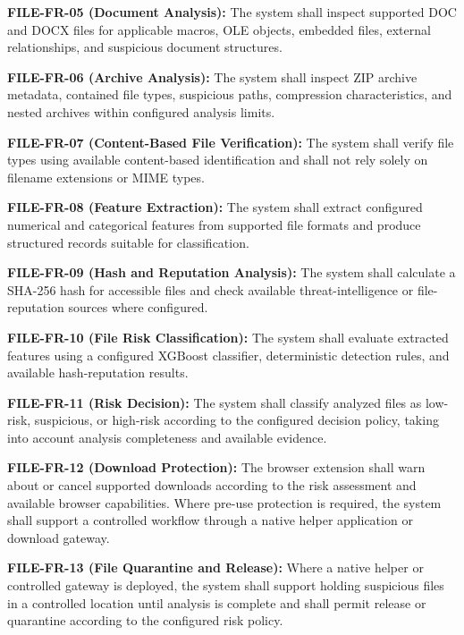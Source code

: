 \documentclass[12pt,a4paper]{report}
\begin{document}
\textbf{FILE-FR-05 (Document Analysis):} The system shall inspect supported DOC and DOCX files for applicable macros, OLE objects, embedded files, external relationships, and suspicious document structures.\par

\textbf{FILE-FR-06 (Archive Analysis):} The system shall inspect ZIP archive metadata, contained file types, suspicious paths, compression characteristics, and nested archives within configured analysis limits.\par

\textbf{FILE-FR-07 (Content-Based File Verification):} The system shall verify file types using available content-based identification and shall not rely solely on filename extensions or MIME types.\par

\textbf{FILE-FR-08 (Feature Extraction):} The system shall extract configured numerical and categorical features from supported file formats and produce structured records suitable for classification.\par

\textbf{FILE-FR-09 (Hash and Reputation Analysis):} The system shall calculate a SHA-256 hash for accessible files and check available threat-intelligence or file-reputation sources where configured.\par

\textbf{FILE-FR-10 (File Risk Classification):} The system shall evaluate extracted features using a configured XGBoost classifier, deterministic detection rules, and available hash-reputation results.\par

\textbf{FILE-FR-11 (Risk Decision):} The system shall classify analyzed files as low-risk, suspicious, or high-risk according to the configured decision policy, taking into account analysis completeness and available evidence.\par

\textbf{FILE-FR-12 (Download Protection):} The browser extension shall warn about or cancel supported downloads according to the risk assessment and available browser capabilities. Where pre-use protection is required, the system shall support a controlled workflow through a native helper application or download gateway.\par

\textbf{FILE-FR-13 (File Quarantine and Release):} Where a native helper or controlled gateway is deployed, the system shall support holding suspicious files in a controlled location until analysis is complete and shall permit release or quarantine according to the configured risk policy.\par
\end{document}
